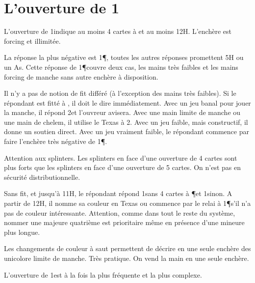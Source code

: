 \chapter{L'ouverture de 1\T}



\begin{multicols}{2}


L'ouverture de 1\T indique au moins 4 cartes à \C et au moins 12H. L'enchère est forcing et illimitée.

La réponse la plus négative est 1\P, toutes les autres réponses promettent 5H ou un As. Cette réponse de 1\P couvre deux cas, les mains très faibles et les mains forcing de manche sans autre enchère à disposition.

Il n'y a pas de notion de fit différé (à l'exception des mains très faibles). Si le répondant est fitté à \C, il doit le dire immédiatement. Avec un jeu banal pour jouer la manche, il répond 2\NT et l'ouvreur avisera. Avec une main limite de manche ou une main de chelem, il utilise le Texas à 2\K. Avec un jeu faible, mais constructif, il donne un soutien direct. Avec un jeu vraiment faible, le répondant commence par faire l'enchère très négative de 1\P.

Attention aux splinters. Les splinters en face d'une ouverture de 4 cartes sont plus forts que les splinters en face d'une ouverture de 5 cartes. On n'est pas en sécurité distributionnelle.

Sans fit, et jusqu'à 11H, le répondant répond 1\K sans 4 cartes à \P et 1\C sinon. A partir de 12H, il nomme sa couleur en Texas ou commence par le relai à 1\P s'il n'a pas de couleur intéressante. Attention, comme dans tout le reste du système, nommer une majeure quatrième est prioritaire même en présence d'une mineure plus longue.

Les changements de couleur à saut permettent de décrire en une seule enchère des unicolore limite de manche. Très pratique. On vend la main en une seule enchère.

L'ouverture de 1\T est à la fois la plus fréquente et la plus complexe.
\end{multicols}



